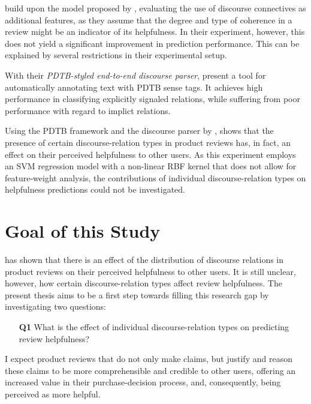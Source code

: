 \documentclass[
    a4paper,%
    12pt,%
    oneside,%
    toc=bibliography,
    final,
]{scrartcl}
\begin{document}
\citet{Mertz2014} build upon the model proposed by \citet{Kim2006}, evaluating the use of discourse connectives as additional features, as they assume that the degree and type of coherence in a review might be an indicator of its helpfulness. In their experiment, however, this does not yield a significant improvement in prediction performance. This can be explained by several restrictions in their experimental setup.

With their \textit{PDTB-styled end-to-end discourse parser}, \citet{Lin2014} present a tool for automatically annotating text with PDTB sense tags. It achieves high performance in classifying explicitly signaled relations, while suffering from poor performance with regard to implict relations.

Using the PDTB framework and the discourse parser by \citet{Lin2014}, \citet{Golly2017} shows that the presence of certain discourse-relation types in product reviews has, in fact, an effect on their perceived helpfulness to other users. As this experiment employs an SVM regression model with a non-linear RBF kernel that does not allow for feature-weight analysis, the contributions of individual discourse-relation types on helpfulness predictions could not be investigated.

\section{Goal of this Study}
\label{sec:goal}

\citet{Golly2017} has shown that there is an effect of the distribution of discourse relations in product reviews on their perceived helpfulness to other users. It is still unclear, however, how certain discourse-relation types affect review helpfulness. The present thesis aims to be a first step towards filling this research gap by investigating two questions:

\begin{enumerate}[rightmargin=1cm]
\item[\textbf{Q1}] What is the effect of individual discourse-relation types on predicting review helpfulness?
\end{enumerate}

I expect product reviews that do not only make claims, but justify and reason these claims to be more comprehensible and credible to other users, offering an increased value in their purchase-decision process, and, consequently, being perceived as more helpful.
\end{document}
